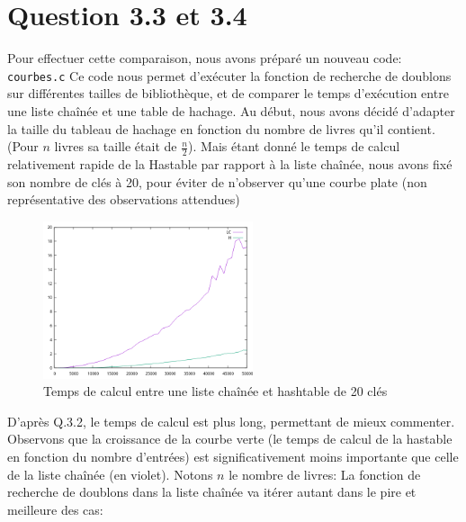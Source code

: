 \documentclass{article}
\begin{document}
    \newpage
    \section{Question 3.3 et 3.4}
    
    Pour effectuer cette comparaison, nous avons préparé un nouveau code: 
    \texttt{courbes.c}
    \newline
    Ce code nous permet d'exécuter la fonction de recherche de doublons sur 
    différentes tailles de bibliothèque, et de comparer le temps d'exécution
    entre une liste chaînée et une table de hachage.
    \newline
    Au début, nous avons décidé d'adapter la taille du tableau de hachage en
    fonction du nombre de livres qu'il contient. (Pour $n$ livres sa taille
    était de $\frac{n}{2}$). 
    \newline
    Mais étant donné le temps de calcul relativement rapide de la Hastable
    par rapport à la liste chaînée, nous avons fixé son nombre de clés à 20,
    pour éviter de n'observer qu'une courbe plate (non représentative des 
    observations attendues)
    \begin{figure}[h]
        \centering
        \includegraphics[width=0.55\textwidth]{graph.png}
        \caption{Temps de calcul entre une liste chaînée et hashtable de 20 clés}
        \label{fig:hash20}
    \end{figure}
    \newline
    D'après Q.3.2, le temps de calcul est plus long, permettant de mieux commenter.
    \newline
    Observons que la croissance de la courbe verte (le temps de calcul de la hastable en fonction du nombre d'entrées)
     est significativement moins importante que
    celle de la liste chaînée (en violet). 
    \newline
    Notons $n$ le nombre de livres: La fonction
    de recherche de doublons dans la liste chaînée va itérer autant dans le pire et meilleure des cas:
\end{document}
